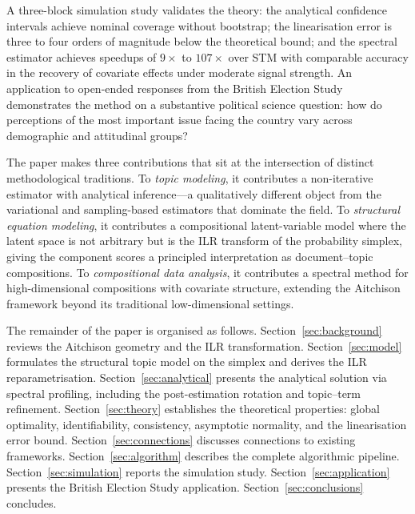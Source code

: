 A three-block simulation study validates the theory: the analytical
confidence intervals achieve nominal coverage without bootstrap; the
linearisation error is three to four orders of magnitude below the
theoretical bound; and the spectral estimator achieves speedups of
$9\times$ to $107\times$ over STM with comparable accuracy in the
recovery of covariate effects under moderate signal strength.
An application to open-ended responses from the British Election
Study demonstrates the method on a substantive political science
question: how do perceptions of the most important issue facing
the country vary across demographic and attitudinal groups?
 
The paper makes three contributions that sit at the intersection
of distinct methodological traditions.
To \emph{topic modeling}, it contributes a non-iterative estimator
with analytical inference---a qualitatively different object from the
variational and sampling-based estimators that dominate the field.
To \emph{structural equation modeling}, it contributes a
compositional latent-variable model where the latent space is not
arbitrary but is the ILR transform of the probability simplex,
giving the component scores a principled interpretation as
document--topic compositions.
To \emph{compositional data analysis}, it contributes a spectral
method for high-dimensional compositions with covariate structure,
extending the Aitchison framework beyond its traditional
low-dimensional settings.
 
The remainder of the paper is organised as follows.
Section~\ref{sec:background} reviews the Aitchison geometry and the
ILR transformation.
Section~\ref{sec:model} formulates the structural topic model on the
simplex and derives the ILR reparametrisation.
Section~\ref{sec:analytical} presents the analytical solution via
spectral profiling, including the post-estimation rotation and
topic--term refinement.
Section~\ref{sec:theory} establishes the theoretical properties:
global optimality, identifiability, consistency, asymptotic
normality, and the linearisation error bound.
Section~\ref{sec:connections} discusses connections to existing
frameworks.
Section~\ref{sec:algorithm} describes the complete algorithmic
pipeline.
Section~\ref{sec:simulation} reports the simulation study.
Section~\ref{sec:application} presents the British Election Study
application.
Section~\ref{sec:conclusions} concludes.